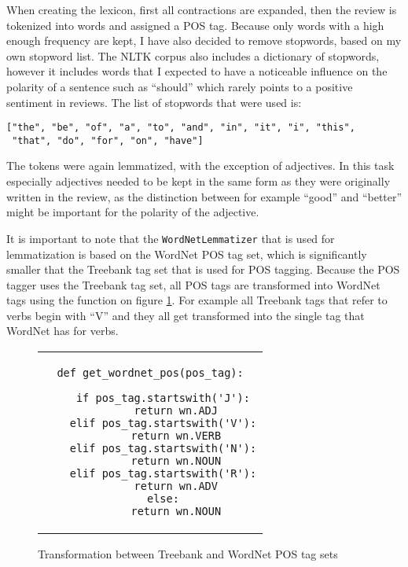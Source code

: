 When creating the lexicon, first all contractions are expanded, then the review is tokenized into words and assigned a POS tag. Because only words with a high enough frequency are kept, I have also decided to remove stopwords, based on my own stopword list. The NLTK corpus also includes a dictionary of stopwords, however it  includes words that I expected to have a noticeable influence on the polarity of a sentence such as ``should'' which rarely points to a positive sentiment in reviews. The list of stopwords that were used is:
\begin{lstlisting}
["the", "be", "of", "a", "to", "and", "in", "it", "i", "this", 
 "that", "do", "for", "on", "have"]
\end{lstlisting}

The tokens were again lemmatized, with the exception of adjectives. In this task especially adjectives needed to be kept in the same form as they were originally written in the review, as the distinction between for example ``good'' and ``better'' might be important for the polarity of the adjective. 

It is important to note that the \texttt{WordNetLemmatizer} that is used for lemmatization is based on the WordNet POS tag set, which is significantly smaller that the Treebank tag set that is used for POS tagging. Because the POS tagger uses the Treebank tag set, all POS tags are transformed into WordNet tags using the function on figure \ref{img:tb_wn}. For example all Treebank tags that refer to verbs begin with ``V'' and they all get transformed into the single tag that WordNet has for verbs.
\begin{figure}
\centering

\begin{tabular}{c}

\begin{lstlisting}
def get_wordnet_pos(pos_tag):

    if pos_tag.startswith('J'):
        return wn.ADJ
    elif pos_tag.startswith('V'):
        return wn.VERB
    elif pos_tag.startswith('N'):
        return wn.NOUN
    elif pos_tag.startswith('R'):
        return wn.ADV
    else:
        return wn.NOUN
\end{lstlisting}
\end{tabular}
\caption{Transformation between Treebank and WordNet POS tag sets}\label{img:tb_wn}
\end{figure}


